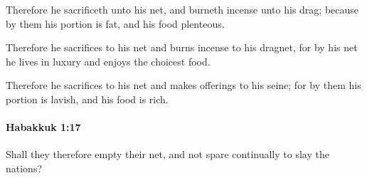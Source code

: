			\begin{versebox}
					\item[BHS] 
					\item[LXX] 
					\item[ASV] Therefore he sacrificeth unto his net, and burneth incense unto his drag; because by them his portion is fat, and his food plenteous.
					\item[NIV] Therefore he sacrifices to his net and burns incense to his dragnet, for by his net he lives in luxury and enjoys the choicest food.
					\item[NRSV] Therefore he sacrifices to his net and makes offerings to his seine; for by them his portion is lavish, and his food is rich.
			\end{versebox}

		\paragraph{Habakkuk 1:17} %
			\label{HABAKKUK-1-17}

			Shall they therefore empty their net, and not spare continually to slay the nations?

